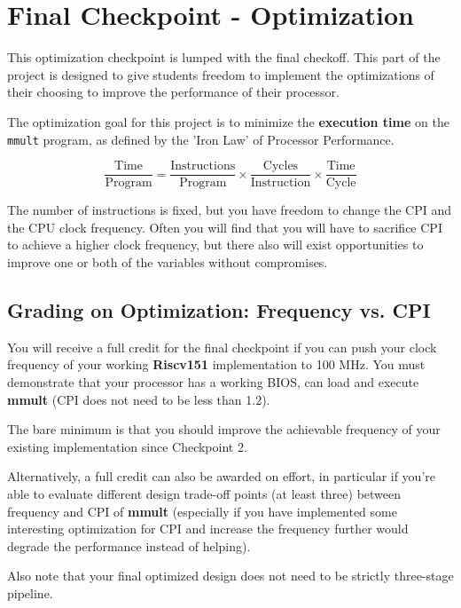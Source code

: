 \documentclass[11pt]{article}
\begin{document}
\newpage
\section{Final Checkpoint - Optimization}

This optimization checkpoint is lumped with the final checkoff.
This part of the project is designed to give students freedom to implement the optimizations of their choosing to improve the performance of their processor.

The optimization goal for this project is to minimize the \textbf{execution time} on the \verb|mmult| program, as defined by the 'Iron Law' of Processor Performance.

\begin{equation*}
\frac{\text{Time}}{\text{Program}} = \frac{\text{Instructions}}{\text{Program}} \times \frac{\text{Cycles}}{\text{Instruction}} \times \frac{\text{Time}}{\text{Cycle}}
\end{equation*}

The number of instructions is fixed, but you have freedom to change the CPI and the CPU clock frequency.
Often you will find that you will have to sacrifice CPI to achieve a higher clock frequency, but there also will exist opportunities to improve one or both of the variables without compromises.

\subsection{Grading on Optimization: Frequency vs. CPI}
You will receive a full credit for the final checkpoint if you can push your clock frequency of your working \textbf{Riscv151} implementation to 100 MHz. You must demonstrate that your processor has a working BIOS, can load and execute \textbf{mmult} (CPI does not need to be less than 1.2).

The bare minimum is that you should improve the achievable frequency of your existing implementation since Checkpoint 2.

Alternatively, a full credit can also be awarded on effort, in particular if you're able to evaluate different design trade-off points (at least three) between frequency and CPI of \textbf{mmult} (especially if you have implemented some interesting optimization for CPI and increase the frequency further would degrade the performance instead of helping).

Also note that your final optimized design does not need to be strictly three-stage pipeline.
\end{document}
